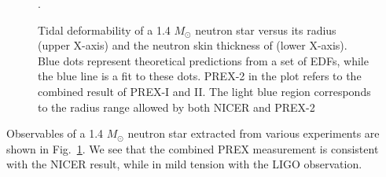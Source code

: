 \begin{figure}[!h]
    \centering
    \caption[Tidal deformability versus Rskin]
    {Tidal deformability of a 1.4 $M_\odot$ neutron star versus its radius (upper X-axis)
    and the neutron skin thickness of \Pb (lower X-axis). Blue dots represent theoretical
    predictions from a set of EDFs, while the blue line is a fit to these dots. 
    PREX-2 in the plot refers to the combined result of PREX-I and II.
    The light blue region corresponds to the radius range allowed by both NICER and
    PREX-2 \cite{PhysRevLett.126.172503}}.
    \label{fig:neutron_star_radius}
\end{figure}

Observables of a 1.4 $M_\odot$ neutron star extracted from various experiments
are shown in Fig.~\ref{fig:neutron_star_radius}. We see that the combined PREX 
measurement is consistent with the NICER result, while in mild tension with
the LIGO observation.

\begin{comment}
    \item Dipole polarizability of an atom $\sim R^3$
	$$ \kappa = \sum_f \frac{|\bra{f}rY_{10}\ket{i}|^2}{E_f - E_i} \propto R^3 $$
    \item Tidal deformability (quadrupole polarizability) of a neutron star scales as $R^5$
	$$ \Lambda = \sum_f \frac{|\bra{f}r^2Y_{20}\ket{i}|^2}{E_f - E_i} \propto R^5 $$
    \item Next generation observer: cosmic explorer (https://arxiv.org/abs/2109.09882)
	can accurately determine deformability of neutron stars
\end{comment}

